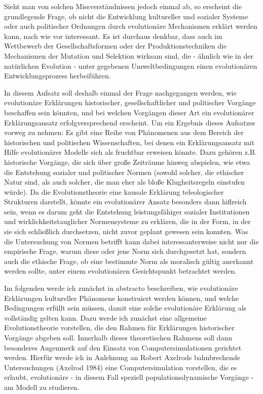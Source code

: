 \documentclass[12pt,a4paper,ngerman]{article}
\begin{document}
Sieht man von solchen Missverständnissen jedoch einmal ab, 
so erscheint die grundlegende Frage, ob nicht die Entwicklung
kultureller und sozialer Systeme oder auch politischer
Ordnungen durch evolutionäre Mechanismen erklärt
werden kann, nach wie vor interessant. Es ist 
durchaus denkbar, dass auch im Wettbewerb der Gesellschaftsformen oder
der Produktionstechniken die Mechanismen der Mutation und Selektion
wirksam sind, die - ähnlich wie in der natürlichen Evolution - unter
gegebenen Umweltbedingungen einen evolutionären Entwicklungsprozess
herbeiführen.

In diesem Aufsatz soll deshalb einmal der Frage nachgegangen werden,
wie evolutionäre Erklärungen historischer, gesellschaftlicher und
politischer Vorgänge beschaffen sein könnten, und bei welchen
Vorgängen dieser Art ein evolutionärer Erklärungsansatz
erfolgversprechend erscheint. Um ein Ergebnis dieses Aufsatzes vorweg
zu nehmen: Es gibt eine Reihe von Phänomenen aus dem Bereich der
historischen und politischen Wissenschaften, bei denen ein
Erklärungsansatz mit Hilfe evolutionärer Modelle sich als fruchtbar
erweisen könnte. Dazu gehören z.B. historische Vorgänge, die sich über
große Zeiträume hinweg abspielen, wie etwa die Entstehung sozialer und
politischer Normen (sowohl solcher, die ethischer Natur sind, als auch
solcher, die man eher als bloße Klugheitsregeln einstufen würde). Da
die Evolutionstheorie eine kausale Erklärung teleologischer Strukturen
darstellt, könnte ein evolutionärer Ansatz besonders dann hiflreich
sein, wenn es darum geht die Entstehung leistungsfähiger sozialer
Institutionen und wirklichkeitstauglicher Normensysteme zu erklären,
die in der Form, in der sie sich schließlich durchsetzen, nicht zuvor
geplant gewesen sein konnten. Was die Untersuchung von Normen betrifft
kann dabei interessanterweise nicht nur die empirische Frage, warum
diese oder jene Norm sich durchgesetzt hat, sondern auch die ethische
Frage, ob eine bestimmte Norm als moralisch gültig anerkannt werden
sollte, unter einem evolutionären Gesichtspunkt betrachtet werden.

Im folgenden werde ich zunächst in abstracto beschreiben, wie
evolutionäre Erklärungen kultureller Phänomene konstruiert werden
können, und welche Bedingungen erfüllt sein müssen, damit eine solche
evolutionäre Erklärung als vollständig gelten kann. Dazu werde ich
zunächst eine allgemeine Evolutionstheorie vorstellen, die den Rahmen
für Erklärungen historischer Vorgänge abgeben soll. Innerhalb dieses
theoretischen Rahmens soll dann besonderes Augenmerk auf den Einsatz von
Computersimulationen gerichtet werden. Hierfür werde ich in Anlehnung
an Robert Axelrods bahnbrechende Untersuchungen (Axelrod 1984) eine
Computersimulation vorstellen, die es erlaubt, evolutionäre - in
diesem Fall speziell populationsdynamische Vorgänge - am Modell zu
studieren. 
\end{document}
